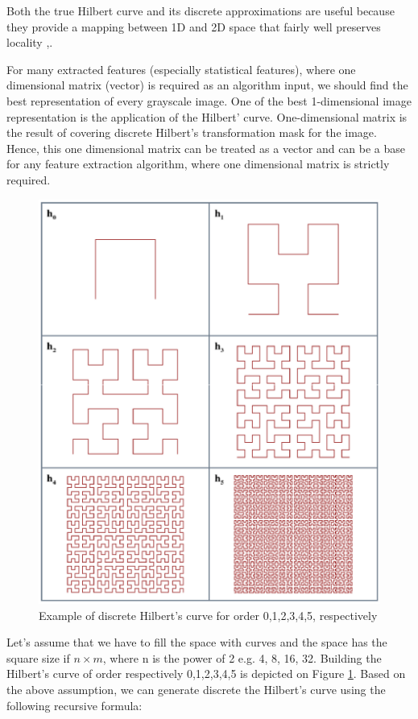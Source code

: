 \documentclass[review,12pt]{elsarticle}
\begin{document}
{Both the true Hilbert curve and its discrete approximations are useful because they provide a mapping between 1D and 2D space that fairly well preserves locality \citep{Jiang2015},\citep{Matlab2015}.

For many extracted features (especially statistical features), where one dimensional matrix (vector) is required as an algorithm input, we should find the best representation of every grayscale image. One of the best 1-dimensional image representation is the application of the Hilbert' curve. One-dimensional matrix is the result of covering discrete Hilbert's transformation mask for the image. Hence, this one dimensional matrix can be treated as a vector and can be a base for any feature extraction algorithm, where one dimensional matrix is strictly required.

\begin{figure}
\center
\includegraphics[scale=0.5]{images/Hilbert.eps}
\caption{Example of discrete Hilbert's curve for order 0,1,2,3,4,5, respectively}
\label{fig:Hilbert}
\end{figure}

Let's assume that we have to fill the space with curves and the space has the square size if $n\times m$, where n is the power of 2 e.g. 4, 8, 16, 32. Building the Hilbert's curve of order respectively 0,1,2,3,4,5 is depicted on Figure \ref{fig:Hilbert}. Based on the above assumption, we can generate discrete the Hilbert's curve using the following recursive formula:

}
\end{document}
